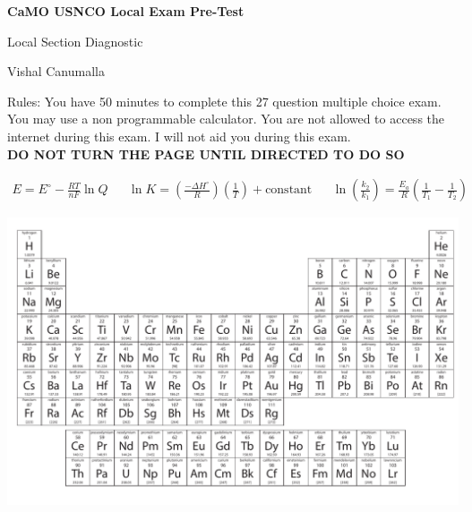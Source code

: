 \documentclass[11pt, leqno]{article}
\begin{document}
\begin{center} \LARGE \textbf{CaMO USNCO Local Exam Pre-Test} \end{center}
\begin{center}
    Local Section Diagnostic
\end{center}
\begin{center} Vishal Canumalla \end{center}


 \noindent Rules: You have 50 minutes to complete this 27 question multiple choice exam. You may use a non programmable calculator. You are not allowed to access the internet during this exam. I will not aid you during this exam. \\
 
 \centering\textbf{DO NOT TURN THE PAGE UNTIL DIRECTED TO DO SO}

\begin{center}

    \begin{align*}
        E = E^{\circ} - \frac{RT}{nF}\ln{Q} && \ln{K} = \left(\frac{-\Delta{H^{\circ}}}{R}\right)\left(\frac{1}{T}\right) + \text{constant} && \ln \left({\frac{k_2}{k_1}}\right) = \frac{E_a}{R}\left(\frac{1}{T_1} - \frac{1}{T_2}\right)
    \end{align*}


\end{center}
\hspace{-0.69 in}\includegraphics[scale = .8]{pertable.pdf}
\end{document}
